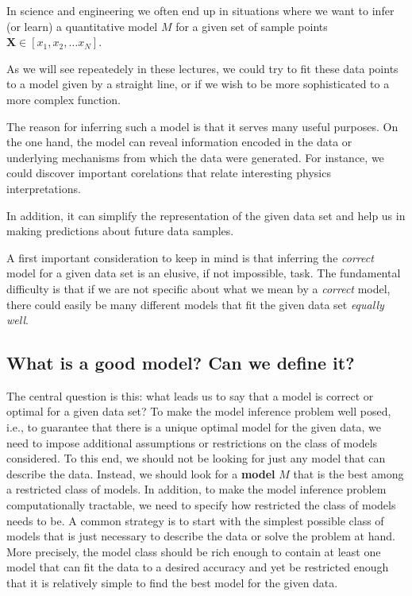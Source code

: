 \documentclass[%
oneside,                 %
final,                   %
10pt]{article}
\begin{document}
In science and engineering we often end up in situations where we want to infer (or learn) a
quantitative model $M$ for a given set of sample points $\bm{X} \in [x_1, x_2,\dots x_N]$.

As we will see repeatedely in these lectures, we could try to fit these data points to a model given by a
straight line, or if we wish to be more sophisticated to a more complex
function.

The reason for inferring such a model is that it
serves many useful purposes. On the one hand, the model can reveal information
encoded in the data or underlying mechanisms from which the data were generated. For instance, we could discover important
corelations that relate interesting physics interpretations.

In addition, it can simplify the representation of the given data set and help
us in making predictions about  future data samples.

A first important consideration to keep in mind is that inferring the \emph{correct} model
for a given data set is an elusive, if not impossible, task. The fundamental difficulty
is that if we are not specific about what we mean by a \emph{correct} model, there
could easily be many different models that fit the given data set \emph{equally well}.


\subsection*{What is a good model? Can we define it?}


The central question is this: what leads us to say that a model is correct or
optimal for a given data set? To make the model inference problem well posed, i.e.,
to guarantee that there is a unique optimal model for the given data, we need to
impose additional assumptions or restrictions on the class of models considered. To
this end, we should not be looking for just any model that can describe the data.
Instead, we should look for a \textbf{model} $M$ that is the best among a restricted class
of models. In addition, to make the model inference problem computationally
tractable, we need to specify how restricted the class of models needs to be. A
common strategy is to start 
with the simplest possible class of models that is just necessary to describe the data
or solve the problem at hand. More precisely, the model class should be rich enough
to contain at least one model that can fit the data to a desired accuracy and yet be
restricted enough that it is relatively simple to find the best model for the given data.
\end{document}
